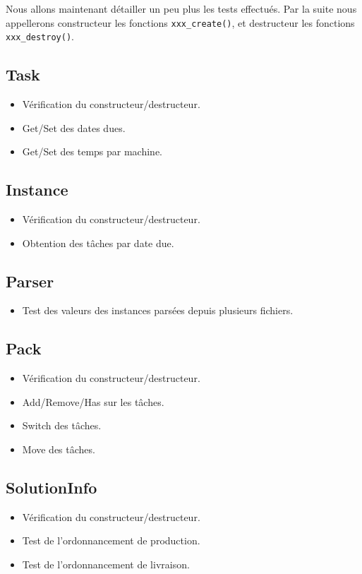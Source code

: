 \documentclass[hideweeklyreports]{polytech/polytech}
\newcommand{\codec}[1]{\texttt{#1}}
\begin{document}
			Nous allons maintenant détailler un peu plus les tests effectués. Par la suite nous appellerons constructeur les fonctions \codec{xxx\_create()}, et destructeur les fonctions \codec{xxx\_destroy()}.
			\subsection{Task}
				\begin{itemize}
					\item Vérification du constructeur/destructeur.
					\item Get/Set des dates dues.
					\item Get/Set des temps par machine.
				\end{itemize}
				
			\subsection{Instance}
				\begin{itemize}
					\item Vérification du constructeur/destructeur.
					\item Obtention des tâches par date due.
				\end{itemize}
				
			\subsection{Parser}
				\begin{itemize}
					\item Test des valeurs des instances parsées depuis plusieurs fichiers.
				\end{itemize}
				
			\subsection{Pack}
				\begin{itemize}
					\item Vérification du constructeur/destructeur.
					\item Add/Remove/Has sur les tâches.
					\item Switch des tâches.
					\item Move des tâches.
				\end{itemize}
				
			\subsection{SolutionInfo}
				\begin{itemize}
					\item Vérification du constructeur/destructeur.
					\item Test de l'ordonnancement de production.
					\item Test de l'ordonnancement de livraison.
				\end{itemize}
				
\end{document}
